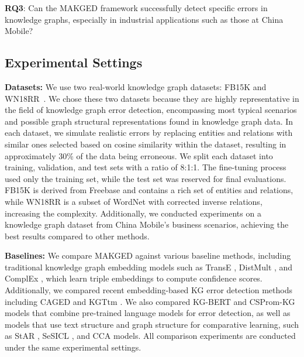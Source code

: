 \noindent\textbf{RQ3}: Can the MAKGED framework successfully detect specific errors in knowledge graphs, especially in industrial applications such as those at China Mobile?


\subsection{Experimental Settings}


\noindent\textbf{Datasets: } 
We use two real-world knowledge graph datasets: FB15K \cite{fb15k} and WN18RR~\cite{wn18rr}. We chose these two datasets because they are highly representative in the field of knowledge graph error detection, encompassing most typical scenarios and possible graph structural representations found in knowledge graph data. In each dataset, we simulate realistic errors by replacing entities and relations with similar ones selected based on cosine similarity within the dataset, resulting in approximately 30\% of the data being erroneous. We split each dataset into training, validation, and test sets with a ratio of 8:1:1. The fine-tuning process used only the training set, while the test set was reserved for final evaluations. 
FB15K is derived from Freebase and contains a rich set of entities and relations, while WN18RR is a subset of WordNet with corrected inverse relations, increasing the complexity. 
Additionally, we conducted experiments on a knowledge graph dataset from China Mobile's business scenarios, achieving the best results compared to other methods. 


\noindent\textbf{Baselines: } We compare MAKGED against various baseline methods, including traditional knowledge graph embedding models such as TransE \cite{transe}, DistMult \cite{distmult}, and ComplEx \cite{complex}, which learn triple embeddings to compute confidence scores. Additionally, we compared recent embedding-based KG error detection methods including CAGED \cite{CAGED} and KGTtm \cite{kgttm}. We also compared KG-BERT \cite{kg-bert} and CSProm-KG \cite{csprom} models that combine pre-trained language models for error detection, as well as models that use text structure and graph structure for comparative learning, such as StAR \cite{star}, SeSICL \cite{sesicl}, and CCA \cite{cca} models. All comparison experiments are conducted under the same experimental settings.


